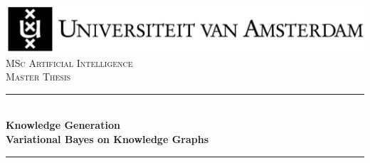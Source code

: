 \documentclass{article}
\begin{document}
\begin{titlepage}



\newcommand{\HRule}{\rule{\linewidth}{0.5mm}} %

\center %

 






\includegraphics[width=\linewidth]{data/images/uvaENG}\\[2.5cm]

\textsc{\Large MSc Artificial Intelligence}\\[0.2cm]

\textsc{\Large Master Thesis}\\[0.5cm] 








\HRule \\[0.4cm]

{ \huge \bfseries Knowledge Generation \\ \Large Variational Bayes on Knowledge Graphs \\ [0.4cm] } %

\HRule \\[0.5cm]

 







\end{titlepage}
\end{document}
